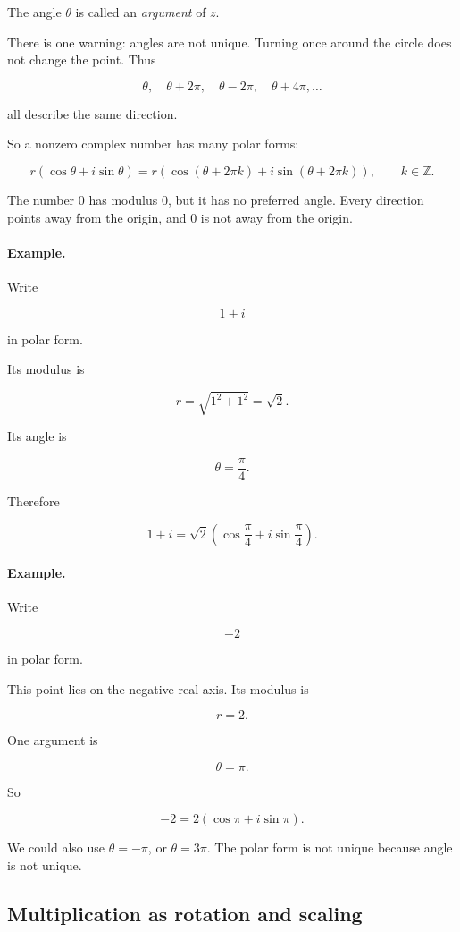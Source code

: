 The angle \(\theta\) is called an \emph{argument} of \(z\).

There is one warning: angles are not unique.  Turning once around the circle does not
change the point.  Thus

\[
\theta,\quad \theta+2\pi,\quad \theta-2\pi,\quad \theta+4\pi,\ldots
\]

all describe the same direction.

So a nonzero complex number has many polar forms:

\[
r(\cos\theta+i\sin\theta)
=
r(\cos(\theta+2\pi k)+i\sin(\theta+2\pi k)),
\qquad k\in\mathbb Z.
\]

The number \(0\) has modulus \(0\), but it has no preferred angle.  Every direction
points away from the origin, and \(0\) is not away from the origin.

\paragraph{Example.}
Write

\[
1+i
\]

in polar form.

Its modulus is

\[
r=\sqrt{1^2+1^2}=\sqrt2.
\]

Its angle is

\[
\theta=\frac{\pi}{4}.
\]

Therefore

\[
\boxed{
1+i=\sqrt2\left(\cos\frac{\pi}{4}+i\sin\frac{\pi}{4}\right).
}
\]

\paragraph{Example.}
Write

\[
-2
\]

in polar form.

This point lies on the negative real axis.  Its modulus is

\[
r=2.
\]

One argument is

\[
\theta=\pi.
\]

So

\[
\boxed{
-2=2(\cos\pi+i\sin\pi).
}
\]

We could also use \(\theta=-\pi\), or \(\theta=3\pi\).  The polar form is not unique
because angle is not unique.

\subsection{Multiplication as rotation and scaling}
\label{subsec:complex-multiplication-rotation-scaling}

